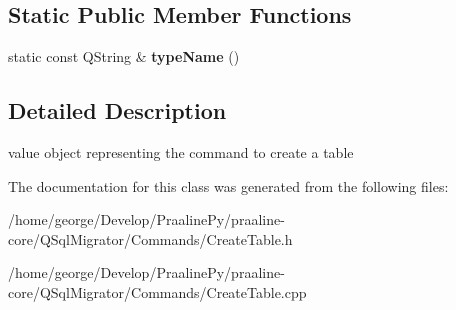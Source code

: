\subsection*{Static Public Member Functions}
\begin{DoxyCompactItemize}
\item 
\mbox{\label{class_q_sql_migrator_1_1_commands_1_1_create_table_a7859b0f3deac5e42d380b0b91a335024}} 
static const Q\+String \& {\bfseries type\+Name} ()
\end{DoxyCompactItemize}


\subsection{Detailed Description}
value object representing the command to create a table 

The documentation for this class was generated from the following files\+:\begin{DoxyCompactItemize}
\item 
/home/george/\+Develop/\+Praaline\+Py/praaline-\/core/\+Q\+Sql\+Migrator/\+Commands/Create\+Table.\+h\item 
/home/george/\+Develop/\+Praaline\+Py/praaline-\/core/\+Q\+Sql\+Migrator/\+Commands/Create\+Table.\+cpp\end{DoxyCompactItemize}
